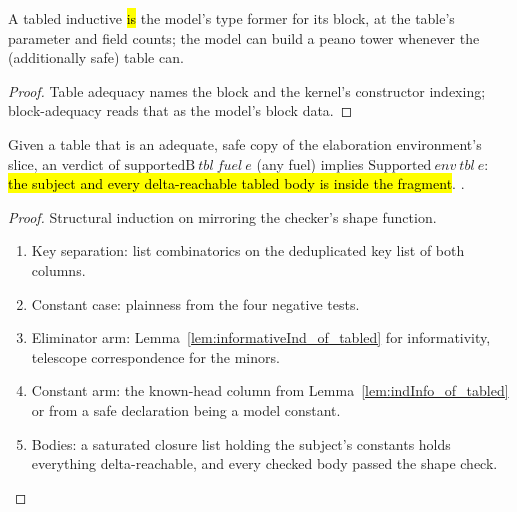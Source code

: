 \begin{lemma}
\label{lem:indInfo_of_tabled}
\leanok
{}
 A tabled inductive \hl{is} the model's type former for its block, at the table's
parameter and field counts; the model can build a peano tower whenever the (additionally safe)
table can.
\end{lemma}
\begin{proof}
\leanok
{}
 Table adequacy names the block and the kernel's constructor indexing; block-adequacy
reads that as the model's block data.
\end{proof}

\begin{theorem}
\label{thm:supportedB_sound}
\leanok
{}
 Given a table that is an adequate, safe copy of the elaboration environment's
slice, an  verdict of $\mathrm{supportedB}\ tbl\ \mathit{fuel}\ e$ (any fuel) implies
$\mathrm{Supported}\ env\ tbl\ e$: \hl{the subject and every delta-reachable tabled body is inside
the fragment}.
 \stProved{}.
\end{theorem}
\begin{proof}
\leanok
{}
 Structural induction on  mirroring the checker's shape function.
\begin{enumerate}
\item Key separation: list combinatorics on the deduplicated key list of both columns.
\item Constant case: plainness from the four negative tests.
\item Eliminator arm: Lemma~\ref{lem:informativeInd_of_tabled} for informativity, telescope
correspondence for the minors.
\item Constant arm: the known-head column from Lemma~\ref{lem:indInfo_of_tabled} or from a safe
declaration being a model constant.
\item Bodies: a saturated closure list holding the subject's constants holds everything
delta-reachable, and every checked body passed the shape check.
\end{enumerate}
\end{proof}

